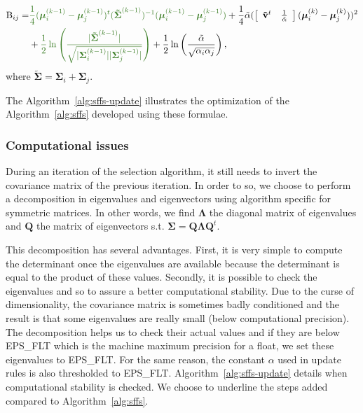 \documentclass[a4paper,11pt,DIV=16,abstracton]{scrartcl}
\begin{document}
        \begin{align}
        \label{eq:jm-update}
            \text{B}_{ij} = &\textcolor{OliveGreen}{\frac{1}{4} (\boldsymbol{\mu}_i^{(k-1)} - \boldsymbol{\mu}_j^{(k-1)})^t ( \boldsymbol{\tilde{\Sigma}}^{(k-1)} )^{-1} (\boldsymbol{\mu}_i^{(k-1)} - \boldsymbol{\mu}_j^{(k-1)})} + \frac{1}{4} \tilde{\alpha} ( \left[\begin{array}{cc} \mathbf{\tilde{v}}^t & \frac{1}{\tilde{\alpha}} \end{array}\right] (\boldsymbol{\mu}_{i}^{(k)} - \boldsymbol{\mu}_{j}^{(k)}) )^2 \nonumber \\
            &+ \textcolor{OliveGreen}{\frac{1}{2} \ln \left( \frac{|\boldsymbol{\tilde{\Sigma}}^{(k-1)}|}{\sqrt{|\boldsymbol{\Sigma}_i^{(k-1)}| |\boldsymbol{\Sigma}_j^{(k-1)}|}} \right)} + \frac{1}{2} \ln \left( \frac{\tilde{\alpha}}{\sqrt{\alpha_i \alpha_j}} \right),
        \end{align}
        where $\boldsymbol{\tilde{\Sigma}} = \boldsymbol{\Sigma}_i + \boldsymbol{\Sigma}_j$.

        The Algorithm~\ref{alg:sffs-update} illustrates the optimization of the Algorithm~\ref{alg:sffs} developed using these formulae.

    \subsubsection{Computational issues}

    During an iteration of the selection algorithm, it still needs to invert the covariance matrix of the previous iteration. In order to so, we choose to perform a decomposition in eigenvalues and eigenvectors using algorithm specific for symmetric matrices. In other words, we find $\boldsymbol{\Lambda}$ the diagonal matrix of eigenvalues and $\mathbf{Q}$ the matrix of eigenvectors s.t. $\boldsymbol{\Sigma} = \mathbf{Q} \boldsymbol{\Lambda} \mathbf{Q}^t$.

    This decomposition has several advantages. First, it is very simple to compute the determinant once the eigenvalues are available because the determinant is equal to the product of these values. Secondly, it is possible to check the eigenvalues and so to assure a better computational stability. Due to the curse of dimensionality, the covariance matrix is sometimes badly conditioned and the result is that some eigenvalues are really small (below computational precision). The decomposition helps us to check their actual values and if they are below EPS\_FLT which is the machine maximum precision for a float, we set these eigenvalues to EPS\_FLT. For the same reason, the constant $\alpha$ used in update rules is also thresholded to EPS\_FLT. Algorithm~\ref{alg:sffs-update} details when computational stability is checked. We choose to underline the steps added compared to Algorithm~\ref{alg:sffs}.
\end{document}
